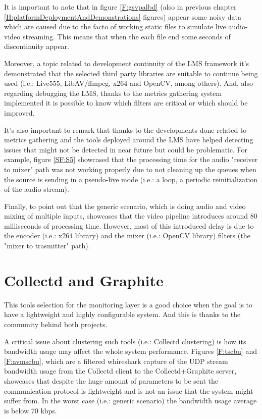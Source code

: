 It is important to note that in figure \ref{F:gsvpalbd} (also in previous chapter \ref{H:platformDeploymentAndDemonstrations} figures) appear some noisy data which are caused due to the facto of working static files to simulate live audio-video streaming. This means that when the each file end some seconds of discontinuity appear.

Moreover, a topic related to development continuity of the LMS framework it's demonstrated that the selected third party libraries are suitable to continue being used (i.e.: Live555, LibAV/ffmpeg, x264 and OpenCV, among others). And, also regarding debugging the LMS, thanks to the metrics gathering system implemented it is possible to know which filters are critical or which should be improved.

It's also important to remark that thanks to the developments done related to metrics gathering and the tools deployed around the LMS have helped detecting issues that might not be detected in near future but could be problematic. For example, figure \ref{SF:S5} showcased that the processing time for the audio "receiver to mixer" path was not working properly due to not cleaning up the queues when the source is sending in a pseudo-live mode (i.e.: a loop, a periodic reinitialization of the audio stream).

Finally, to point out that the generic scenario, which is doing audio and video mixing of multiple inputs, showcases that the video pipeline introduces around 80 milliseconds of processing time. However, most of this introduced delay is due to the encoder (i.e.: x264 library) and the mixer (i.e.: OpenCV library) filters (the "mixer to trasmitter" path).

\section{Collectd and Graphite}

This tools selection for the monitoring layer is a good choice when the goal is to have a lightweight and highly configurable system. And this is thanks to the community behind both projects.

A critical issue about clustering such tools (i.e.: Collectd clustering) is how its bandwidth usage may affect the whole system performance. Figures \ref{F:tscbu} and \ref{F:avmscbu}, which are a filtered whireshark capture of the UDP stream bandwidth usage from the Collectd client to the Collectd+Graphite server, showcases that despite the huge amount of parameters to be sent the communication protocol is lightweight and is not an issue that the system might suffer from. In the worst case (i.e.: generic scenario) the bandwidth usage average is below 70 kbps.

